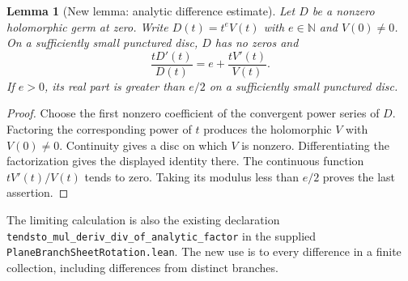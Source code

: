 \documentclass[11pt,oneside]{report}
\newtheorem{lemma}[theorem]{Lemma}
\theoremstyle{definition}
\numberwithin{equation}{section}
\newcommand{\decl}[1]{\textnormal{\nolinkurl{#1}}}
\begin{document}
\begin{lemma}[New lemma: analytic difference estimate]\label{J14:lem:log}
Let $D$ be a nonzero holomorphic germ at zero. Write
$D(t)=t^eV(t)$ with $e\in\mathbb N$ and $V(0)\ne0$.
On a sufficiently small punctured disc, $D$ has no zeros and
\[
 \frac{tD'(t)}{D(t)}=e+\frac{tV'(t)}{V(t)}.
\]
If $e>0$, its real part is greater than $e/2$ on a sufficiently small
punctured disc.
\end{lemma}
\begin{proof}
Choose the first nonzero coefficient of the convergent power series of $D$.
Factoring the corresponding power of $t$ produces the holomorphic $V$ with
$V(0)\ne0$. Continuity gives a disc on which $V$ is nonzero.
Differentiating the factorization gives the displayed identity there.
The continuous function $tV'(t)/V(t)$ tends to zero. Taking its modulus less
than $e/2$ proves the last assertion.
\end{proof}

The limiting calculation is also the existing declaration
\decl{tendsto_mul_deriv_div_of_analytic_factor} in the supplied
\decl{PlaneBranchSheetRotation.lean}. The new use is to every difference in
a finite collection, including differences from distinct branches.
\end{document}
